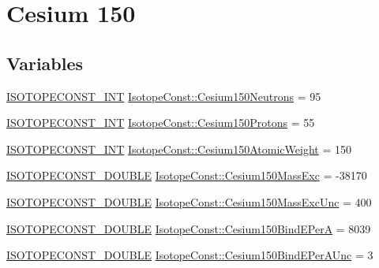 \hypertarget{group___isotope_const-_cesium-_cs150}{}\section{Cesium 150}
\label{group___isotope_const-_cesium-_cs150}
\subsection*{Variables}
\begin{DoxyCompactItemize}
\item 
\mbox{\hyperlink{group___isotope_const-_macros_ga5f18360b3e99483a35c32d789e62621c}{I\+S\+O\+T\+O\+P\+E\+C\+O\+N\+S\+T\+\_\+\+I\+NT}} \mbox{\hyperlink{group___isotope_const-_cesium-_cs150_ga69930dd5c9411c6d11db1e716df7b903}{Isotope\+Const\+::\+Cesium150\+Neutrons}} = 95
\item 
\mbox{\hyperlink{group___isotope_const-_macros_ga5f18360b3e99483a35c32d789e62621c}{I\+S\+O\+T\+O\+P\+E\+C\+O\+N\+S\+T\+\_\+\+I\+NT}} \mbox{\hyperlink{group___isotope_const-_cesium-_cs150_ga64c9fa68eb913e4f91f2f742cfadf17c}{Isotope\+Const\+::\+Cesium150\+Protons}} = 55
\item 
\mbox{\hyperlink{group___isotope_const-_macros_ga5f18360b3e99483a35c32d789e62621c}{I\+S\+O\+T\+O\+P\+E\+C\+O\+N\+S\+T\+\_\+\+I\+NT}} \mbox{\hyperlink{group___isotope_const-_cesium-_cs150_gaefa737b1282f60019a7c12ed3f4a342e}{Isotope\+Const\+::\+Cesium150\+Atomic\+Weight}} = 150
\item 
\mbox{\hyperlink{group___isotope_const-_macros_ga8f45a7272ce02c0b4c65c44636ed719a}{I\+S\+O\+T\+O\+P\+E\+C\+O\+N\+S\+T\+\_\+\+D\+O\+U\+B\+LE}} \mbox{\hyperlink{group___isotope_const-_cesium-_cs150_ga55f1c70e56c56de2a9258b5e002001cb}{Isotope\+Const\+::\+Cesium150\+Mass\+Exc}} = -\/38170
\item 
\mbox{\hyperlink{group___isotope_const-_macros_ga8f45a7272ce02c0b4c65c44636ed719a}{I\+S\+O\+T\+O\+P\+E\+C\+O\+N\+S\+T\+\_\+\+D\+O\+U\+B\+LE}} \mbox{\hyperlink{group___isotope_const-_cesium-_cs150_gac38da1b69f44b338eab97c38ec01a2b9}{Isotope\+Const\+::\+Cesium150\+Mass\+Exc\+Unc}} = 400
\item 
\mbox{\hyperlink{group___isotope_const-_macros_ga8f45a7272ce02c0b4c65c44636ed719a}{I\+S\+O\+T\+O\+P\+E\+C\+O\+N\+S\+T\+\_\+\+D\+O\+U\+B\+LE}} \mbox{\hyperlink{group___isotope_const-_cesium-_cs150_ga7cce3975c9f1c15e2ecf86c96e643c2a}{Isotope\+Const\+::\+Cesium150\+Bind\+E\+PerA}} = 8039
\item 
\mbox{\hyperlink{group___isotope_const-_macros_ga8f45a7272ce02c0b4c65c44636ed719a}{I\+S\+O\+T\+O\+P\+E\+C\+O\+N\+S\+T\+\_\+\+D\+O\+U\+B\+LE}} \mbox{\hyperlink{group___isotope_const-_cesium-_cs150_ga0d85046e8aa27880ce8c24b69b7220b8}{Isotope\+Const\+::\+Cesium150\+Bind\+E\+Per\+A\+Unc}} = 3

\end{DoxyCompactItemize}

